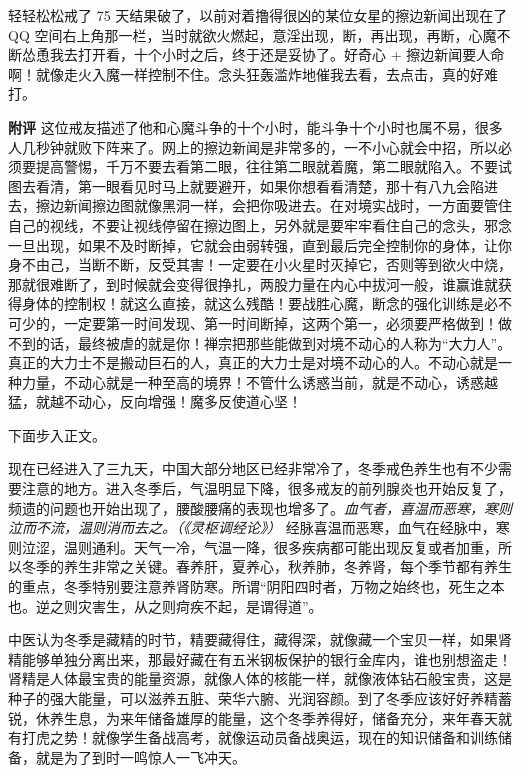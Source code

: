 \begin{case}
    轻轻松松戒了 75 天结果破了，以前对着撸得很凶的某位女星的擦边新闻出现在了 QQ 空间右上角那一栏，当时就欲火燃起，意淫出现，断，再出现，再断，心魔不断怂恿我去打开看，十个小时之后，终于还是妥协了。好奇心 + 擦边新闻要人命啊！就像走火入魔一样控制不住。念头狂轰滥炸地催我去看，去点击，真的好难打。

    \textbf{附评} 这位戒友描述了他和心魔斗争的十个小时，能斗争十个小时也属不易，很多人几秒钟就败下阵来了。网上的擦边新闻是非常多的，一不小心就会中招，所以必须要提高警惕，千万不要去看第二眼，往往第二眼就着魔，第二眼就陷入。不要试图去看清，第一眼看见时马上就要避开，如果你想看看清楚，那十有八九会陷进去，擦边新闻擦边图就像黑洞一样，会把你吸进去。在对境实战时，一方面要管住自己的视线，不要让视线停留在擦边图上，另外就是要牢牢看住自己的念头，邪念一旦出现，如果不及时断掉，它就会由弱转强，直到最后完全控制你的身体，让你身不由己，当断不断，反受其害！一定要在小火星时灭掉它，否则等到欲火中烧，那就很难断了，到时候就会变得很挣扎，两股力量在内心中拔河一般，谁赢谁就获得身体的控制权！就这么直接，就这么残酷！要战胜心魔，断念的强化训练是必不可少的，一定要第一时间发现、第一时间断掉，这两个第一，必须要严格做到！做不到的话，最终被虐的就是你！禅宗把那些能做到对境不动心的人称为“大力人”。真正的大力士不是搬动巨石的人，真正的大力士是对境不动心的人。不动心就是一种力量，不动心就是一种至高的境界！不管什么诱惑当前，就是不动心，诱惑越猛，就越不动心，反向增强！魔多反使道心坚！
\end{case}

下面步入正文。

现在已经进入了三九天，中国大部分地区已经非常冷了，冬季戒色养生也有不少需要注意的地方。进入冬季后，气温明显下降，很多戒友的前列腺炎也开始反复了，频遗的问题也开始出现了，腰酸腰痛的表现也增多了。\textit{血气者，喜温而恶寒，寒则泣而不流，温则消而去之。（《灵枢调经论》）} 经脉喜温而恶寒，血气在经脉中，寒则泣涩，温则通利。天气一冷，气温一降，很多疾病都可能出现反复或者加重，所以冬季的养生非常之关键。春养肝，夏养心，秋养肺，冬养肾，每个季节都有养生的重点，冬季特别要注意养肾防寒。所谓“阴阳四时者，万物之始终也，死生之本也。逆之则灾害生，从之则疴疾不起，是谓得道”。

中医认为冬季是藏精的时节，精要藏得住，藏得深，就像藏一个宝贝一样，如果肾精能够单独分离出来，那最好藏在有五米钢板保护的银行金库内，谁也别想盗走！肾精是人体最宝贵的能量资源，就像人体的核能一样，就像液体钻石般宝贵，这是种子的强大能量，可以滋养五脏、荣华六腑、光润容颜。到了冬季应该好好养精蓄锐，休养生息，为来年储备雄厚的能量，这个冬季养得好，储备充分，来年春天就有打虎之势！就像学生备战高考，就像运动员备战奥运，现在的知识储备和训练储备，就是为了到时一鸣惊人一飞冲天。

